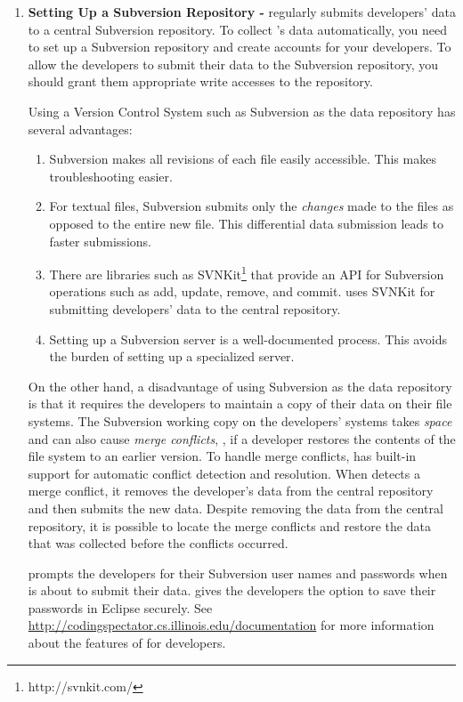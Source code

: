\begin{enumerate}
\item
\textbf{Setting Up a Subversion Repository -}
\CodingSpectator{} regularly submits developers' data to a central Subversion
repository. To collect \CodingSpectator's data automatically, you need to set up
a Subversion repository and create accounts for your developers. To allow the developers
to submit their data to the Subversion repository, you should grant them
appropriate write accesses to the repository.

Using a Version Control System such as Subversion as the data repository has
several advantages:

\begin{enumerate}
%
\item Subversion makes all revisions of each file easily accessible. This makes
  troubleshooting easier.
%
\item For textual files, Subversion submits only the \emph{changes} made to the
  files as opposed to the entire new file. This differential data submission
  leads to faster submissions.
%
\item There are libraries such as SVNKit\footnote{http://svnkit.com/} that
  provide an API for Subversion operations such as add, update, remove, and
  commit. \CodingSpectator{} uses SVNKit for submitting developers' data to the
  central repository.
%
\item Setting up a Subversion server is a well-documented process. This avoids
  the burden of setting up a specialized server.
%
\end{enumerate}

On the other hand, a disadvantage of using Subversion as the data repository is
that it requires the developers to maintain a copy of their data on their file
systems. The Subversion working copy on the developers' systems takes \emph{space}
and can also cause \emph{merge conflicts}, \eg, if a developer restores the contents
of the file system to an earlier version. To handle merge conflicts,
\CodingSpectator{} has built-in support for automatic conflict detection and
resolution. When \CodingSpectator{} detects a merge conflict, it removes the
developer's data from the central repository and then submits the new data. Despite
removing the data from the central repository, it is possible to locate
the merge conflicts and restore the data that was collected before the conflicts occurred.

\CodingSpectator{} prompts the developers for their Subversion user names and
passwords when \CodingSpectator{} is about to submit their data.
\CodingSpectator{} gives the developers the option to save their passwords in Eclipse
securely. See \url{http://codingspectator.cs.illinois.edu/documentation} for
more information about the features of \CodingSpectator{} for developers.


\end{enumerate}
